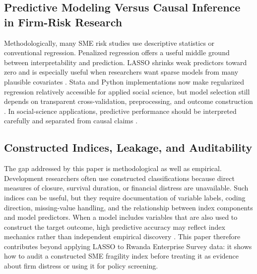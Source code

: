 \subsection{Predictive Modeling Versus Causal Inference in Firm-Risk Research}

Methodologically, many SME risk studies use descriptive statistics or conventional regression. Penalized regression offers a useful middle ground between interpretability and prediction. LASSO shrinks weak predictors toward zero and is especially useful when researchers want sparse models from many plausible covariates \citep{tibshirani1996regression, friedman2010regularization, hastie2015sparsity}. Stata and Python implementations now make regularized regression relatively accessible for applied social science, but model selection still depends on transparent cross-validation, preprocessing, and outcome construction \citep{ahrens2020lassopack, arlot2010crossvalidation}. In social-science applications, predictive performance should be interpreted carefully and separated from causal claims \citep{shmueli2010explain, mullainathan2017machine, athey2019machine}.

\subsection{Constructed Indices, Leakage, and Auditability}

The gap addressed by this paper is methodological as well as empirical. Development researchers often use constructed classifications because direct measures of closure, survival duration, or financial distress are unavailable. Such indices can be useful, but they require documentation of variable labels, coding direction, missing-value handling, and the relationship between index components and model predictors. When a model includes variables that are also used to construct the target outcome, high predictive accuracy may reflect index mechanics rather than independent empirical discovery \citep{kleinberg2018human}. This paper therefore contributes beyond applying LASSO to Rwanda Enterprise Survey data: it shows how to audit a constructed SME fragility index before treating it as evidence about firm distress or using it for policy screening.
